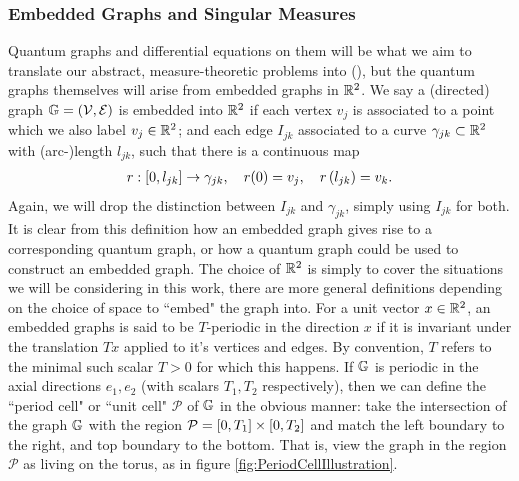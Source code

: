 \subsubsection{Embedded Graphs and Singular Measures} \label{sssec:EmbeddedGraphs}
Quantum graphs and differential equations on them will be what we aim to translate our abstract, measure-theoretic problems into (), but the quantum graphs themselves will arise from embedded graphs in $\mathbb{R}^2$.
We say a (directed) graph $\mathbb{G} = \left( \mathcal{V},\mathcal{E} \right)$ is embedded into $\mathbb{R}^2$ if each vertex $v_j$ is associated to a point which we also label $v_j\in\mathbb{R}^2$; and each edge $I_{jk}$ associated to a curve $\gamma_{jk}\subset\mathbb{R}^2$ with (arc-)length $l_{jk}$, such that there is a continuous map
\begin{align*}
	r: \left[ 0,l_{jk} \right] \rightarrow \gamma_{jk}, \quad r(0) = v_j, \quad r\left( l_{jk} \right) = v_k.
\end{align*}
Again, we will drop the distinction between $I_{jk}$ and $\gamma_{jk}$, simply using $I_{jk}$ for both.
It is clear from this definition how an embedded graph gives rise to a corresponding quantum graph, or how a quantum graph could be used to construct an embedded graph.
The choice of $\mathbb{R}^2$ is simply to cover the situations we will be considering in this work, there are more general definitions depending on the choice of space to ``embed" the graph into.
For a unit vector $x\in\mathbb{R}^2$, an embedded graphs is said to be $T$-periodic in the direction $x$ if it is invariant under the translation $Tx$ applied to it's vertices and edges.
By convention, $T$ refers to the minimal such scalar $T>0$ for which this happens.
If $\mathbb{G}$ is periodic in the axial directions $e_1, e_2$ (with scalars $T_1, T_2$ respectively), then we can define the ``period cell" or ``unit cell" $\mathcal{P}$ of $\mathbb{G}$ in the obvious manner: take the intersection of the graph $\mathbb{G}$ with the region $\mathcal{P} = \left[ 0,T_1 \right]\times\left[ 0,T_2 \right]$ and match the left boundary to the right, and top boundary to the bottom.
That is, view the graph in the region $\mathcal{P}$ as living on the torus, as in figure \ref{fig:PeriodCellIllustration}.
